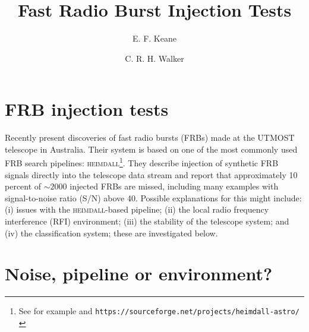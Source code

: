 \documentclass[RNAAS]{aastex62}
\begin{document}
\title{Fast Radio Burst Injection Tests}


\author[0000-0002-4553-655X]{E. F. Keane}

\author[0000-0002-1943-1324]{C. R. H. Walker}



\section{FRB injection tests}

Recently \citet{Wael2019} present discoveries of fast radio bursts (FRBs) made at the UTMOST telescope in Australia. Their system is based on one of the most commonly used FRB search pipelines: \textsc{heimdall}\footnote{See for example \citealt{bbf10} and \texttt{https://sourceforge.net/projects/heimdall-astro/}}. They describe injection of synthetic FRB signals directly into the telescope data stream and report that approximately 10 percent of $\sim2000$ injected FRBs are missed, including many examples with signal-to-noise ratio (S/N) above 40. Possible explanations for this might include: (i) issues with the \textsc{heimdall}-based pipeline; (ii) the local radio frequency interference (RFI) environment; (iii) the stability of the telescope system; and (iv) the classification system; these are investigated below.

\section{Noise, pipeline or environment?}
\end{document}
